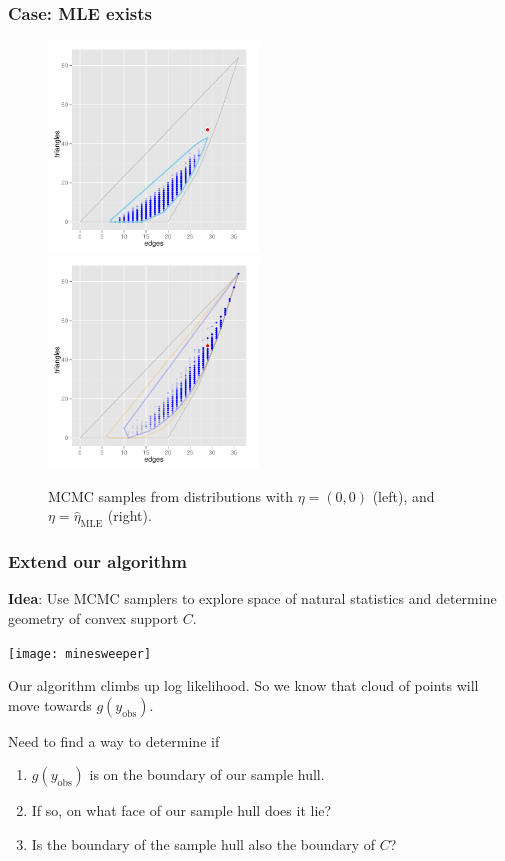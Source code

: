 \documentclass[slidestop,compress, 10pt]{beamer}
\newcommand{\etaMLE}{\hat{\eta}_{\textrm{MLE}}}
\newcommand{\yobs}{y_{\text{obs}}}
\begin{document}
\frame
{
\frametitle{Case: MLE exists}  
\begin{figure}[h]
\centering
\includegraphics[height=2.2in]{MCsample-far}
\includegraphics[height=2.2in]{MCsample-MLE}
\caption{MCMC samples from distributions with $\eta = (0,0)$ (left), and $\eta=\etaMLE$ (right).}
\label{F:MCsample-MLE exists}
\end{figure}
}


\frame
{
\frametitle{Extend our algorithm}  
\textbf{Idea}: Use MCMC samplers to explore space of natural statistics and
determine geometry of convex support $C$.
\vspace{2mm}

\texttt{[image: minesweeper]}
\vspace{2mm}

Our algorithm climbs up log likelihood.  So we know that cloud of points will move towards $g(\yobs)$.
\vspace{2mm}

Need to find a way to determine if
\begin{enumerate}
\item $g(\yobs)$ is on the boundary of our sample hull.
\item If so, on what face of our sample hull does it lie?
\item Is the boundary of the sample hull also the boundary of $C$?
\end{enumerate}
}
\end{document}
